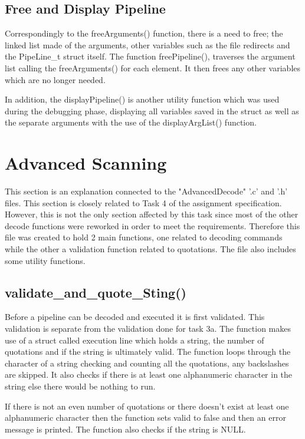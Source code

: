 \documentclass[12pt, a4paper]{report}
\begin{document}
\section{Free and Display Pipeline}
Correspondingly to the freeArguments() function, there is a need to free; the linked list made of the arguments, other variables such as the file redirects and the PipeLine\_t struct itself. The function freePipeline(), traverses the argument list calling the freeArguments() for each element. It then frees any other variables which are no longer needed.

In addition, the displayPipeline() is another utility function which was used during the debugging phase, displaying all variables saved in the struct as well as the separate arguments with the use of the displayArgList() function.

\chapter{Advanced Scanning}
This section is an explanation connected to the "AdvancedDecode" '.c' and '.h' files. This section is closely related to Task 4 of the assignment specification. However, this is not the only section affected by this task since most of the other decode functions were reworked in order to meet the requirements. Therefore this file was created to hold 2 main functions, one related to decoding commands while the other a validation function related to quotations. The file also includes some utility functions.

\section{validate\_and\_quote\_Sting()}
Before a pipeline can be decoded and executed it is first validated. This validation is separate from the validation done for task 3a. The function makes use of a struct called execution line which holds a string, the number of quotations and if the string is ultimately valid. The function loops through the character of a string checking and counting all the quotations, any backslashes are skipped. It also checks if there is at least one alphanumeric character in the string else there would be nothing to run.

If there is not an even number of quotations or there doesn't exist at least one alphanumeric character then the function sets valid to false and then an error message is printed. The function also checks if the string is NULL.
\end{document}
